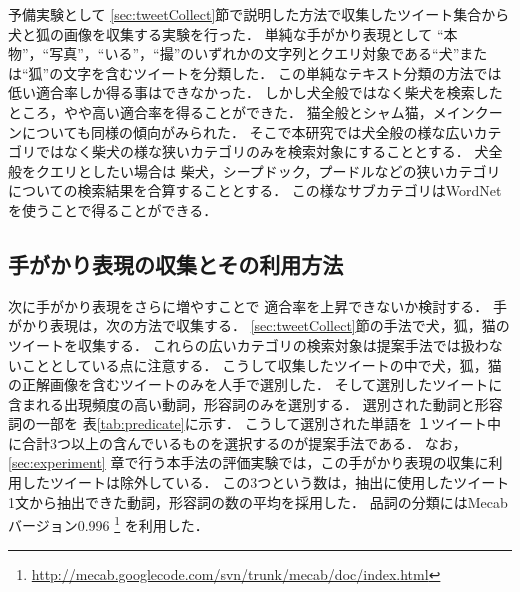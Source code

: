 予備実験として
\ref{sec:tweetCollect}節で説明した方法で収集したツイート集合から
犬と狐の画像を収集する実験を行った．
単純な手がかり表現として
``本物''，``写真''，``いる''，``撮''のいずれかの文字列とクエリ対象である``犬''または``狐''の文字を含むツイートを分類した．
この単純なテキスト分類の方法では低い適合率しか得る事はできなかった．
しかし犬全般ではなく柴犬を検索したところ，やや高い適合率を得ることができた．
猫全般とシャム猫，メインクーンについても同様の傾向がみられた．
そこで本研究では犬全般の様な広いカテゴリではなく柴犬の様な狭いカテゴリのみを検索対象にすることとする．
犬全般をクエリとしたい場合は
柴犬，シープドック，プードルなどの狭いカテゴリについての検索結果を合算することとする．
この様なサブカテゴリはWordNetを使うことで得ることができる．









\subsection{手がかり表現の収集とその利用方法}

次に手がかり表現をさらに増やすことで
適合率を上昇できないか検討する．
手がかり表現は，次の方法で収集する．
%
\ref{sec:tweetCollect}節の手法で犬，狐，猫のツイートを収集する．
これらの広いカテゴリの検索対象は提案手法では扱わないこととしている点に注意する．
こうして収集したツイートの中で犬，狐，猫の正解画像を含むツイートのみを人手で選別した．
そして選別したツイートに含まれる出現頻度の高い動詞，形容詞のみを選別する．
選別された動詞と形容詞の一部を
表\ref{tab:predicate}に示す．
こうして選別された単語を
１ツイート中に合計3つ以上の含んでいるものを選択するのが提案手法である．
なお，
\ref{sec:experiment}
章で行う本手法の評価実験では，この手がかり表現の収集に利用したツイートは除外している．
この3つという数は，抽出に使用したツイート1文から抽出できた動詞，形容詞の数の平均を採用した．
品詞の分類にはMecabバージョン0.996
\footnote{\url{http://mecab.googlecode.com/svn/trunk/mecab/doc/index.html}}
を利用した．




